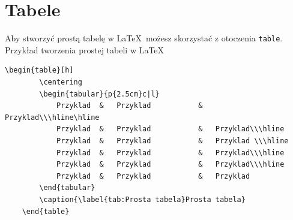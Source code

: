 \section{Tabele}\label{sec:tabel}

Aby stworzyć prostą tabelę w \LaTeX\, możesz skorzystać z otoczenia \texttt{table}. 
Przykład tworzenia prostej tabeli w \LaTeX\

\begin{lstlisting}[caption={Kod prostej tabeli}, label=lst:Kod prostej tabeli]
	\begin{table}[h]
		\centering
		\begin{tabular}{p{2.5cm}c|l}
			Przyklad  &   Przyklad           &   Przyklad\\\hline\hline
			Przyklad  &   Przyklad           &   Przyklad\\\hline
			Przyklad  &   Przyklad           &   Przyklad \\\hline
			Przyklad  &   Przyklad           &   Przyklad\\\hline
			Przyklad  &   Przyklad           &   Przyklad\\\hline
			Przyklad  &   Przyklad           &   Przyklad
		\end{tabular}
		\caption{\label{tab:Prosta tabela}Prosta tabela}
	\end{table}
\end{lstlisting}

